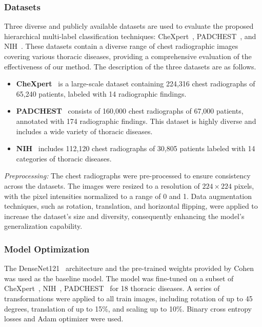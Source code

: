 \documentclass[review,1p,times,numbers]{elsarticle}
\begin{document}
\subsubsection{Datasets}
Three diverse and publicly available datasets are used to evaluate the proposed hierarchical multi-label classification techniques: CheXpert~\cite{irvin_CheXpert_2019}, PADCHEST~\cite{bustos_Padchest_2020}, and NIH~\cite{wang_ChestXRay8_2017}. These datasets contain a diverse range of chest radiographic images covering various thoracic diseases, providing a comprehensive evaluation of the effectiveness of our method. The description of the three datasets are as follows.
\begin{itemize}
    \item  \textbf{CheXpert}~\cite{irvin_CheXpert_2019} is a large-scale dataset containing 224,316 chest radiographs of 65,240 patients, labeled with 14 radiographic findings.
    \item \textbf{PADCHEST}~\cite{bustos_Padchest_2020} consists of 160,000 chest radiographs of 67,000 patients, annotated with 174 radiographic findings. This dataset is highly diverse and includes a wide variety of thoracic diseases.
    \item \textbf{NIH}~\cite{wang_ChestXRay8_2017} includes 112,120 chest radiographs of 30,805 patients labeled with 14 categories of thoracic diseases.
\end{itemize}

\textit{Preprocessing: }
The chest radiographs were pre-processed to ensure consistency across the datasets. The images were resized to a resolution of $224 \times 224$ pixels, with the pixel intensities normalized to a range of 0 and 1. Data augmentation techniques, such as rotation, translation, and horizontal flipping, were applied to increase the dataset's size and diversity, consequently enhancing the model's generalization capability.

\subsubsection{Model Optimization}
The DenseNet121~\cite{huang_Densely_2017} architecture and the pre-trained weights provided by Cohen~\cite{cohen_TorchXRayVision_2022} was used as the baseline model. The model was fine-tuned on a subset of CheXpert~\cite{irvin_CheXpert_2019}, NIH~\cite{wang_ChestXRay8_2017}, PADCHEST~\cite{bustos_Padchest_2020} for 18 thoracic diseases. A series of transformations were applied to all train images, including rotation of up to 45 degrees, translation of up to 15\%, and scaling up to 10\%. Binary cross entropy losses and Adam optimizer were used.
\end{document}
